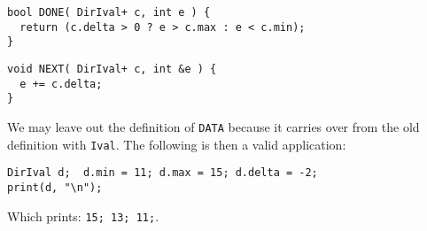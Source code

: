 \documentclass{sigplanconf}
\begin{document}
\begin{samepage}
\begin{verbatim}
bool DONE( DirIval+ c, int e ) {
  return (c.delta > 0 ? e > c.max : e < c.min);
}
\end{verbatim}
\end{samepage}
\begin{samepage}
\begin{verbatim}
void NEXT( DirIval+ c, int &e ) { 
  e += c.delta; 
}
\end{verbatim}
\end{samepage}
We may leave out the definition of \verb+DATA+ because it carries over
from the old definition with \verb+Ival+. The following is then a
valid application:
\begin{samepage}
\begin{verbatim}
DirIval d;  d.min = 11; d.max = 15; d.delta = -2;
print(d, "\n");
\end{verbatim}
\end{samepage}
Which prints: \verb+15; 13; 11;+.
\end{document}
